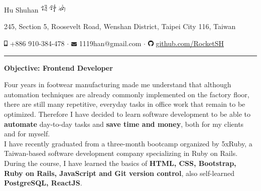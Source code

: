 \documentclass[a4paper,10pt]{article}
\begin{document}
\pagestyle{empty} %
\frenchspacing


\begin{center}
  \Huge{Hu Shuhan \includegraphics[height=1.2em,trim=0 10mm 0 -1cm]{shared/signature.png}}\par

\normalsize 245, Section 5, Roosevelt Road, Wenshan District, Taipei City 116, Taiwan 
\vspace*{.3em}

  \includegraphics[width=0.5em]{shared/mobile-alt.eps} {+886 910-384-478} $\cdot$
  \includegraphics[width=0.8em]{shared/envelope.eps} {1119han@gmail.com} $\cdot$
  \includegraphics[width=0.8em]{shared/github.eps}
  \href{https://github.com/RocketSH}{github.com/RocketSH} 

\rule{15.2cm}{0.05em}
\vspace*{.5em}
\begin{center}
  \large{\textbf{Objective: Frontend Developer}}
\end{center}
\vspace*{.5em}

\begin{center}
  \begin{minipage}{0.9\textwidth}
    Four years in footwear manufacturing made me understand that although automation techniques are already commonly
    implemented on the factory floor, there are still many repetitive, everyday tasks in office work that remain to be optimized. Therefore I have decided to learn software development to be able to \textbf{automate} day-to-day tasks and \textbf{save
    time and money}, both for my clients and for myself.
    \vspace*{1em}\\
    I have recently graduated from a three-month bootcamp organized by 5xRuby, a Taiwan-based
    software development company specializing in Ruby on Rails.
    During the course, I have learned the basics of \textbf{HTML, CSS, Bootstrap, Ruby on
    Rails, JavaScript and Git version control}, also self-learned
    \textbf{PostgreSQL, ReactJS}.
  \end{minipage}
\end{center}
\vspace*{.8em}


\end{center}
\end{document}
